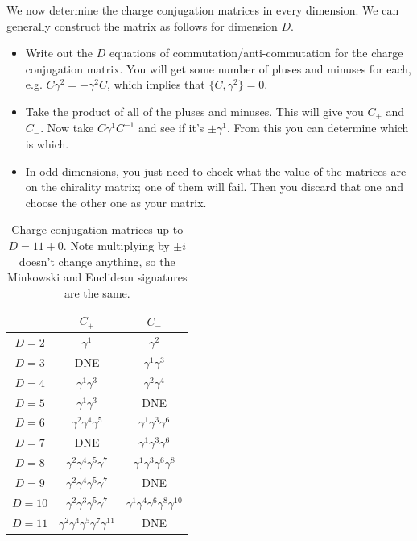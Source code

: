\documentclass[11pt]{article}
\begin{document}
We now determine the charge conjugation matrices in every dimension.
We can generally construct the matrix as follows for dimension $D$.
\begin{itemize}
    \item Write out the $D$ equations of commutation/anti-commutation
    for the charge conjugation matrix. You will get some number of pluses
    and minuses for each, e.g. $C \gamma^2 = - \gamma^2 C$, which implies
    that $\{ C, \gamma^2 \} = 0$.
    \item Take the product of all of the pluses and minuses. This will give you
    $C_+$ and $C_-$. Now take $C \gamma^1 C^{-1}$ and see if it's $\pm \gamma^1$.
    From this you can determine which is which.
    \item In odd dimensions, you just need to check what the value of the matrices
    are on the chirality matrix; one of them will fail. Then you discard that one
    and choose the other one as your matrix.
\end{itemize}

\begin{table}[H]
    \centering
    \label{table:c_matrices}
    \begin{tabular}{|c|c|c|}
        \hline
        & $C_+$ & $C_-$ \\
        \hline
        $D = 2$ & $\gamma^1$ & $\gamma^2$\\
        $D = 3$ & DNE & $\gamma^1 \gamma^3$\\
        $D = 4$ & $\gamma^1 \gamma^3$ & $\gamma^2 \gamma^4$\\
        $D = 5$ & $\gamma^1 \gamma^3$ & DNE\\
        $D = 6$ & $\gamma^2 \gamma^4 \gamma^5$ & $\gamma^1 \gamma^3 \gamma^6$\\
        $D = 7$ & DNE & $\gamma^1 \gamma^3 \gamma^6$\\
        $D = 8$ & $\gamma^2 \gamma^4 \gamma^5 \gamma^7$ & $\gamma^1 \gamma^3 \gamma^6 \gamma^8$\\
        $D = 9$ & $\gamma^2 \gamma^4 \gamma^5 \gamma^7$ & DNE\\
        $D = 10$ & $\gamma^2 \gamma^3 \gamma^5 \gamma^7$ & $\gamma^1 \gamma^4 \gamma^6 \gamma^8 \gamma^{10}$\\
        $D = 11$ & $\gamma^2 \gamma^4 \gamma^5 \gamma^7 \gamma^{11}$ & DNE\\
        \hline
    \end{tabular}
    \caption{Charge conjugation matrices up to $D = 11 + 0$. Note multiplying
    by $\pm i$ doesn't change anything, so the Minkowski and Euclidean signatures
    are the same.}
\end{table}
\end{document}
